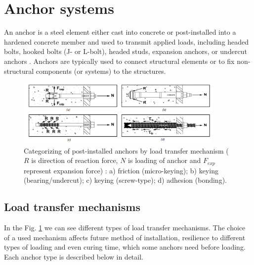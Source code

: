 
\thispagestyle{plain}
\section{Anchor systems}
An anchor is a steel element either cast into concrete or post-installed into a hardened concrete member and used to transmit applied loads, including headed bolts, hooked bolts (J- or L-bolt), headed studs, expansion anchors, or undercut anchors \cite{anchors-ACI-318M}. Anchors are typically used to connect structural elements or to fix non-structural components (or systems) to the structures. 

\begin{figure}[h!]
	\centering
	\includegraphics[width=0.9\textwidth]{obrazky/post_installed_anchor_types_repaired.png}
	\caption[Types of post-installed anchors with different load transfer mechanism]{Categorizing of post-installed anchors by load transfer mechanism ($R$ is direction of reaction force, $N$ is loading of anchor and $F_{exp}$ represent expansion force) \cite{hilti_anchors}: a) friction (micro-keying); b) keying (bearing/undercut); c) keying (screw-type); d) adhesion (bonding).}\label{obr:Post_installed_anchors}
\end{figure}

\subsection{Load transfer mechanisms}
In the Fig. \ref{obr:Post_installed_anchors} we can see different types of load transfer mechanisms. The choice of a  used mechanism affects future method of installation, resilience to different types of loading and even curing time, which some anchors need before loading. Each anchor type is described below in detail. 


